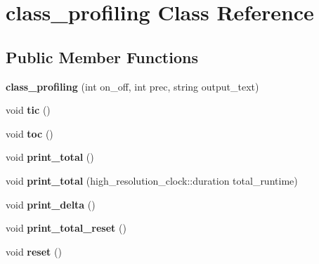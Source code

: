 \hypertarget{classclass__profiling}{}\section{class\+\_\+profiling Class Reference}
\label{classclass__profiling}
\subsection*{Public Member Functions}
\begin{DoxyCompactItemize}
\item 
{\bfseries class\+\_\+profiling} (int on\+\_\+off, int prec, string output\+\_\+text)\hypertarget{classclass__profiling_ad2499fbdce43693c141be79c64f263fe}{}\label{classclass__profiling_ad2499fbdce43693c141be79c64f263fe}

\item 
void {\bfseries tic} ()\hypertarget{classclass__profiling_a1e2411d23e0f9dbbae5dc16bb3d11c9e}{}\label{classclass__profiling_a1e2411d23e0f9dbbae5dc16bb3d11c9e}

\item 
void {\bfseries toc} ()\hypertarget{classclass__profiling_a9737e79b970bae933b618d4d5e11c5c4}{}\label{classclass__profiling_a9737e79b970bae933b618d4d5e11c5c4}

\item 
void {\bfseries print\+\_\+total} ()\hypertarget{classclass__profiling_a8ee7e833d8117954638938519947ba65}{}\label{classclass__profiling_a8ee7e833d8117954638938519947ba65}

\item 
void {\bfseries print\+\_\+total} (high\+\_\+resolution\+\_\+clock\+::duration total\+\_\+runtime)\hypertarget{classclass__profiling_af774e788e2d158d9b34bf5d80922bbdc}{}\label{classclass__profiling_af774e788e2d158d9b34bf5d80922bbdc}

\item 
void {\bfseries print\+\_\+delta} ()\hypertarget{classclass__profiling_a25a1665c2ce4fc1a7ebca800c4b905eb}{}\label{classclass__profiling_a25a1665c2ce4fc1a7ebca800c4b905eb}

\item 
void {\bfseries print\+\_\+total\+\_\+reset} ()\hypertarget{classclass__profiling_add41ff5269b0f0de0cffdbb8b91886ff}{}\label{classclass__profiling_add41ff5269b0f0de0cffdbb8b91886ff}

\item 
void {\bfseries reset} ()\hypertarget{classclass__profiling_ad842a23db6f8674144a9e8150adb2c46}{}\label{classclass__profiling_ad842a23db6f8674144a9e8150adb2c46}

\end{DoxyCompactItemize}
